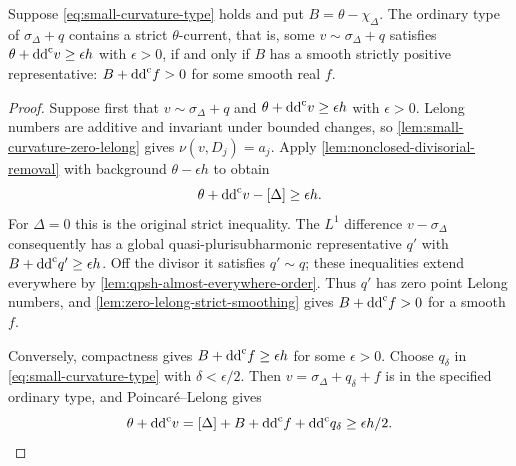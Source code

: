 \begin{theorem}\label{thm:small-curvature-strict-type}
Suppose \eqref{eq:small-curvature-type} holds and put
$B=\theta-\chi_\Delta$. The ordinary type of $\sigma_\Delta+q$
contains a strict $\theta$-current, that is, some $v\sim\sigma_\Delta+q$
satisfies $\theta+\mathrm{dd}^{\mathrm{c}} v\geq\epsilon h$ with $\epsilon>0$, if and only
if $B$ has a smooth strictly positive representative: $B+\mathrm{dd}^{\mathrm{c}} f>0$ for
some smooth real $f$.
\end{theorem}
\begin{proof}
Suppose first that $v\sim\sigma_\Delta+q$ and
$\theta+\mathrm{dd}^{\mathrm{c}} v\geq\epsilon h$ with $\epsilon>0$.
Lelong numbers are additive and invariant under bounded changes, so
\cref{lem:small-curvature-zero-lelong} gives $\nu(v,D_j)=a_j$.
Apply \cref{lem:nonclosed-divisorial-removal} with background
$\theta-\epsilon h$ to obtain
\[
 \theta+\mathrm{dd}^{\mathrm{c}} v-[\Delta]\geq\epsilon h.
\]
For $\Delta=0$ this is the original strict inequality.
The $L^1$ difference $v-\sigma_\Delta$ consequently has a global
quasi-plurisubharmonic representative $q'$ with
$B+\mathrm{dd}^{\mathrm{c}} q'\geq\epsilon h$. Off the divisor it satisfies $q'\sim q$;
these inequalities extend everywhere by
\cref{lem:qpsh-almost-everywhere-order}. Thus $q'$ has zero point
Lelong numbers, and \cref{lem:zero-lelong-strict-smoothing} gives
$B+\mathrm{dd}^{\mathrm{c}} f>0$ for a smooth $f$.

Conversely, compactness gives $B+\mathrm{dd}^{\mathrm{c}} f\geq\epsilon h$ for some
$\epsilon>0$. Choose $q_\delta$ in \eqref{eq:small-curvature-type} with
$\delta<\epsilon/2$. Then $v=\sigma_\Delta+q_\delta+f$ is in the
specified ordinary type, and Poincar\'e--Lelong gives
\[
 \theta+\mathrm{dd}^{\mathrm{c}} v=[\Delta]+B+\mathrm{dd}^{\mathrm{c}} f+\mathrm{dd}^{\mathrm{c}} q_\delta
                    \geq\epsilon h/2.
\]
\end{proof}
